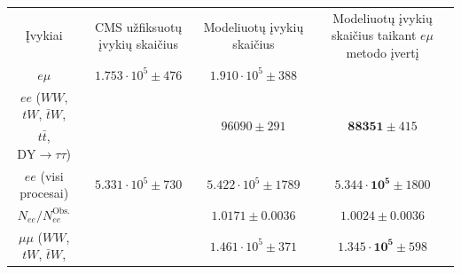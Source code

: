 \documentclass[a4paper, 12pt]{article}
\newcommand{\WW}{W\! W}
\newcommand{\mumu}{\mu\mu}
\newcommand{\DYtau}{\mathrm{DY} \! \rightarrow \! \tau\tau}
\begin{document}
\begin{centering}
\begin{table}
\begin{tabular}{|c|c|c|c|} %
	\hline
	
	\multirow{3}{8em}{\centering Įvykiai} &
	\multirow{3}{7em}{\centering CMS užfiksuotų įvykių skaičius} &
	\multirow{3}{9em}{\centering Modeliuotų įvykių skaičius} &
	\multirow{3}{10em}{\centering Modeliuotų įvykių skaičius taikant $e\mu$ metodo įvertį} \\
	
 	& & & \\
 	& & & \\
	\hline \hline
	
	\multirow{2}{8em}{\centering $e\mu$} &
	\multirow{2}{7em}{\centering $1.753 \cdot 10^5 \pm 476$} &
	\multirow{2}{9em}{\centering $1.910 \cdot 10^5 \pm 388$ } &
	\multirow{2}{5em}{\centering \textendash }\\
	
 	& & & \\
	\hline
	
	$ee$ ($\WW$, $tW$, $\bar{t}W$, &
	\multirow{2}{7em}{\centering\textendash} &
	\multirow{2}{9em}{\centering $96090 \pm 291$} &
	\multirow{2}{9em}{\centering$\mathbf{88351} \pm 415$} \\
	
	$t\bar{t}$, $\DYtau$) & & & \\
	\hline
	
	\multirow{2}{8em}{\centering $ee$ (visi procesai)} &
	\multirow{2}{7em}{\centering $5.331 \cdot 10^5 \pm 730$} &
	\multirow{2}{10em}{\centering $5.422 \cdot 10^5 \pm 1789$}
	&\multirow{2}{10em}{\centering $\mathbf{5.344 \cdot 10^5} \pm 1800$} \\
	
 	& & & \\
	\hline

	\multirow{2}{8em}{\centering $N_{ee}/N_{ee}^{\mathrm{Obs.}}$} &
	\multirow{2}{7em}{\centering 1} &
	\multirow{2}{10em}{\centering $1.0171 \pm 0.0036$} &
	\multirow{2}{10em}{\centering $1.0024 \pm 0.0036$} \\
	
 	& & & \\
	\hline

	$\mumu$ ($\WW$, $tW$, $\bar{t}W$, &
	\multirow{2}{7em}{\centering\textendash} &
	\multirow{2}{9em}{\centering $1.461 \cdot 10^5 \pm 371$} &
	\multirow{2}{9em}{\centering$\mathbf{1.345 \cdot 10^5} \pm 598$} \\
	

\end{tabular}
\end{table}
\end{centering}
\end{document}
